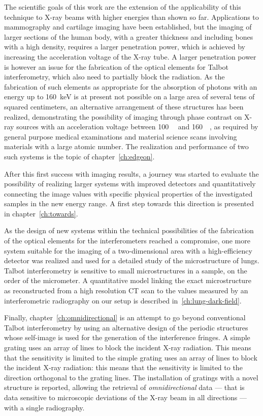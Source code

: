 The scientific goals of this work are the extension of the applicability of
this technique to X-ray beams with higher energies than shown so far.
Applications to mammography and cartilage imaging have been established, but
the imaging of larger sections of the human body, with a greater thickness
and including bones with a high density, requires a larger penetration
power, which is achieved by increasing the acceleration voltage of the X-ray
tube. A larger penetration power is however an issue for the fabrication of
the optical elements for Talbot interferometry, which also need to partially block the
radiation. As the fabrication of such elements as appropriate for the
absorption of photons with an energy up to \SI{160}{\kilo\eV} is at present
not possible on a large area of several tens of squared centimeters, an
alternative arrangement of these structures has been realized, demonstrating
the possibility of imaging through phase contrast on X-ray sources with an
acceleration voltage between \SI{100}{\kilo\voltpeak} and
\SI{160}{\kilo\voltpeak}, as required by general purpose medical
examinations and material science scans involving materials with a large
atomic number. The realization and performance of two such systems is the
topic of chapter~\ref{ch:edgeon}.

After this first success with imaging results, a journey was started to
evaluate the possibility of realizing larger systems with improved detectors
and quantitatively connecting the image values with specific physical
properties of the investigated samples in the new energy range. A first step
towards this direction is presented in chapter~\ref{ch:towards}.

As the design of new systems within the technical possibilities of the
fabrication of the optical elements for the interferometers reached a
compromise, one more system suitable for the imaging of a two-dimensional
area with a high-efficiency detector was realized and used for a detailed
study of the microstructure of lungs. Talbot interferometry is sensitive to
small microstructures in a sample, on the order of the micrometer. A
quantitative model linking the exact microstructure as reconstructed from a
high resolution \ac{CT} scan to the values measured by an interferometric
radiography on our setup is described in~\ref{ch:lung-dark-field}.

Finally, chapter~\ref{ch:omnidirectional} is an attempt to go beyond
conventional Talbot interferometry by using an alternative design of the
periodic structures whose self-image is used for the generation of the
interference fringes. A simple grating uses an array of lines to block the
incident X-ray radiation. This means that the sensitivity is limited to the
simple grating uses an array of lines to block the incident X-ray radiation:
this means that the sensitivity is limited to the direction orthogonal to
the grating lines. The installation of gratings with a novel structure is
reported, allowing the retrieval of \emph{omnidirectional} data --- that is
data sensitive to microscopic deviations of the X-ray beam in all directions
--- with a single radiography.
